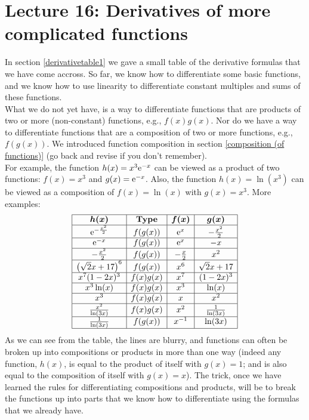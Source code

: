 \chapter{Lecture 16: Derivatives of more complicated functions}
In section \ref{derivativetable1} we gave a small table of the derivative formulas that we have come accross. So far, we know how to differentiate some basic functions, and we know how to use linearity to differentiate constant multiples and sums of these functions. \\

\noindent What we do not yet have, is a way to differentiate functions that are products of two or more (non-constant) functions, e.g., $f(x)g(x)$. Nor do we have a way to differentiate functions that are a composition of two or more functions, e.g., $f(g(x))$. We introduced function composition in section \ref{composition (of functions)} (go back and revise if you don't remember). \\

\noindent For example, the function $h(x) = x^3\mathrm{e}^{-x}$ can be viewed as a product of two functions: $f(x) = x^3$ and $g(x) = \mathrm{e}^{-x}$. Also, the function $h(x) = \ln(x^3)$ can be viewed as a composition of $f(x) = \ln(x)$ with $g(x) = x^3$. More examples:
\[
\begin{array}{|c|c|c|c|} \hline
\boldsymbol{h(x)}   	   & \textbf{Type} 		& \boldsymbol{f(x)}  & \boldsymbol{g(x)} \\ \hline
\e^{-\frac{x^2}{2}}  & f(g(x))      			& \e^x			& -\frac{x^2}{2} 	\\ \hline
\e^{-x}			   & f(g(x))				& \e^x 			& -x \\ \hline
-\frac{x^2}{2}		   & f(g(x))				& -\frac{x}{2}		& x^2 \\ \hline
\brac{\sqrt{2}x+17}^6 & f(g(x))			& x^6			& \sqrt{2}x+ 17 \\ \hline
x^7(1-2x)^3		  & f(x)g(x)			& x^7			& (1-2x)^3 \\ \hline		
x^3\ln(x)			  & f(x)g(x)			& x^3			& \ln(x) \\ \hline
x^3 				  & f(x)g(x) 			& x 				& x^2 \\ \hline
\frac{x^2}{\ln(3x)}	 & f(x)g(x)				& x^2			& \frac{1}{\ln(3x)} \\ \hline
\frac{1}{\ln(3x)}	& f(g(x)) 				& x^{-1}			& \ln(3x) \\ \hline
\end{array}
\bigskip
\]
As we can see from the table, the lines are blurry, and functions can often be broken up into compositions or products in more than one way (indeed any function, $h(x)$, is equal to the product of itself with $g(x) = 1$; and is also equal to the composition of itself with $g(x) = x$). The trick, once we have learned the rules for differentiating compositions and products, will be to break the functions up into parts that we know how to differentiate using the formulas that we already have.

